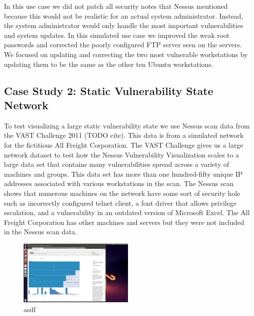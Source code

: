 \documentclass{acm_proc_article-sp}
\begin{document}
In this use case we did not patch all security notes that Nessus mentioned
because this would not be realistic for an actual system administrator. Instead,
the system administrator would only handle the most important vulnerabilities and
system updates. In this simulated use case we improved the weak root passwords
and corrected the poorly configured FTP server seen on the servers. We focused on updating
and correcting the two most vulnerable workstations by updating them to be the
same as the other ten Ubuntu workstations.



\subsection{Case Study 2: Static Vulnerability State Network }
To test visualizing a large static vulnerability state we use Nessus scan data from
the VAST Challenge 2011 (TODO cite). This data is from a simulated network for the
fictitious All Freight Corporation. The VAST Challenge gives us a large network
dataset to test how the Nessus Vulnerability Visualization scales to a large
data set that contains many vulnerabilities spread across a variety of machines and
groups. This data set has more than one
hundred-fifty unique IP addresses associated with various workstations in the
scan. The Nessus scan shows that numerous
machines on the network have some sort of security hole such as incorrectly
configured telnet client, a font driver that allows privilege escalation, and a
vulnerability in an outdated version of Microsoft Excel. The All Freight
Corporation has other machines and servers but they were not included in the
Nessus scan data.

\begin{figure}
  \centering
  \includegraphics[width=0.5\textwidth]{../screenshots/final/VastGroup}
  \caption{asdf}
\end{figure}
\end{document}
